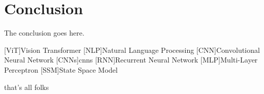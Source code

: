 \documentclass[conference]{IEEEtran}
\begin{document}
  \section{Conclusion}
  The conclusion goes here.

  \printbibliography

  \begin{acronym}
    [ViT]{Vision Transformer}
    [NLP]{Natural Language Processing}
    [CNN]{Convolutional Neural Network}
    [CNNs]{\acp{cnn}}
    [RNN]{Recurrent Neural Network}
    [MLP]{Multi-Layer Perceptron}
    [SSM]{State Space Model}
  \end{acronym}


that's all folks
\end{document}
